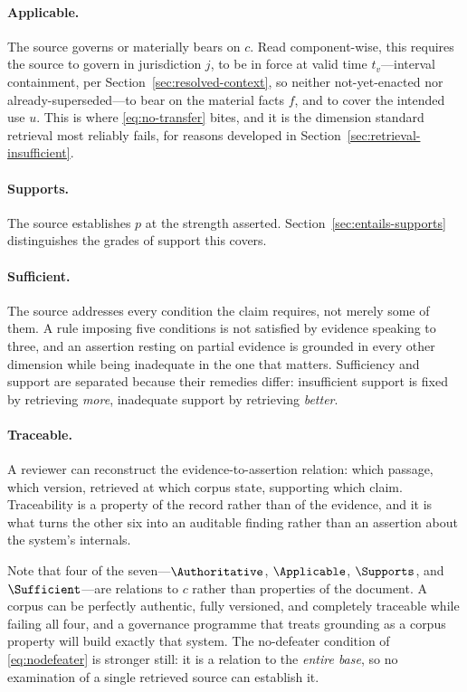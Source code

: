 \paragraph{Applicable.} The source governs or materially bears on $c$. Read
component-wise, this requires the source to govern in jurisdiction $j$, to be in force
at valid time $t_v$---interval containment, per
Section~\ref{sec:resolved-context}, so neither not-yet-enacted nor
already-superseded---to bear on the material facts $f$, and to cover the intended use
$u$. This is where \eqref{eq:no-transfer} bites, and it is the dimension standard
retrieval most reliably fails, for reasons developed in
Section~\ref{sec:retrieval-insufficient}.

\paragraph{Supports.} The source establishes $p$ at the strength asserted.
Section~\ref{sec:entails-supports} distinguishes the grades of support this covers.

\paragraph{Sufficient.} The source addresses every condition the claim requires,
not merely some of them. A rule imposing five conditions is not satisfied by evidence
speaking to three, and an assertion resting on partial evidence is grounded in every
other dimension while being inadequate in the one that matters. Sufficiency and
support are separated because their remedies differ: insufficient support is fixed by
retrieving \emph{more}, inadequate support by retrieving \emph{better}.

\paragraph{Traceable.} A reviewer can reconstruct the evidence-to-assertion
relation: which passage, which version, retrieved at which corpus state, supporting
which claim. Traceability is a property of the record rather than of the evidence, and
it is what turns the other six into an auditable finding rather than an assertion
about the system's internals.

Note that four of the seven---$\Authoritative$, $\Applicable$, $\Supports$, and
$\Sufficient$---are relations to $c$ rather than properties of the document. A corpus
can be perfectly authentic, fully versioned, and completely traceable while failing
all four, and a governance programme that treats grounding as a corpus property will
build exactly that system. The no-defeater condition of \eqref{eq:nodefeater} is
stronger still: it is a relation to the \emph{entire base}, so no examination of a
single retrieved source can establish it.

